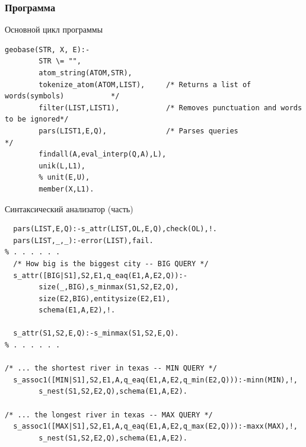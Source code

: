 \documentclass[10pt]{beamer}
\begin{document}
\begin{frame}[fragile]
  \frametitle{Программа}
  Основной цикл программы
\begin{verbatim}
geobase(STR, X, E):-
        STR \= "",
        atom_string(ATOM,STR),
        tokenize_atom(ATOM,LIST),     /* Returns a list of words(symbols)           */
        filter(LIST,LIST1),           /* Removes punctuation and words to be ignored*/
        pars(LIST1,E,Q),              /* Parses queries                            */
        findall(A,eval_interp(Q,A),L),
        unik(L,L1),
        % unit(E,U),
        member(X,L1).
\end{verbatim}
  Синтаксический анализатор (часть)
\begin{verbatim}
  pars(LIST,E,Q):-s_attr(LIST,OL,E,Q),check(OL),!.
  pars(LIST,_,_):-error(LIST),fail.
% . . . . . .
  /* How big is the biggest city -- BIG QUERY */
  s_attr([BIG|S1],S2,E1,q_eaq(E1,A,E2,Q)):-
		size(_,BIG),s_minmax(S1,S2,E2,Q),
		size(E2,BIG),entitysize(E2,E1),
		schema(E1,A,E2),!.

  s_attr(S1,S2,E,Q):-s_minmax(S1,S2,E,Q).
% . . . . . .

/* ... the shortest river in texas -- MIN QUERY */
  s_assoc1([MIN|S1],S2,E1,A,q_eaq(E1,A,E2,q_min(E2,Q))):-minn(MIN),!,
		s_nest(S1,S2,E2,Q),schema(E1,A,E2).

/* ... the longest river in texas -- MAX QUERY */
  s_assoc1([MAX|S1],S2,E1,A,q_eaq(E1,A,E2,q_max(E2,Q))):-maxx(MAX),!,
		s_nest(S1,S2,E2,Q),schema(E1,A,E2).
\end{verbatim}
\end{frame}
\end{document}
